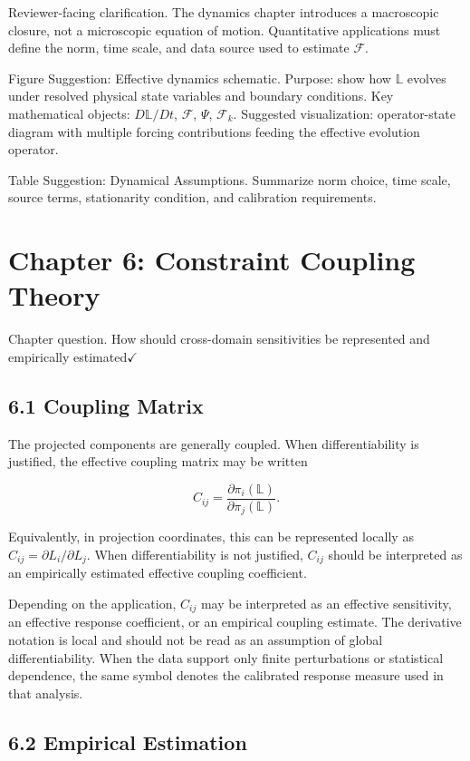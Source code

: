 \documentclass[aps,pre,reprint,superscriptaddress,nofootinbib]{revtex4-2}
\begin{document}
Reviewer-facing clarification. The dynamics chapter introduces a macroscopic closure, not a microscopic equation of motion. Quantitative applications must define the norm, time scale, and data source used to estimate \(\mathcal{F}\).

Figure Suggestion: Effective dynamics schematic. Purpose: show how \(\mathbb{L}\) evolves under resolved physical state variables and boundary conditions. Key mathematical objects: \(D\mathbb{L}/Dt\), \(\mathcal{F}\), \(\Psi\), \(\mathcal{F}_k\). Suggested visualization: operator-state diagram with multiple forcing contributions feeding the effective evolution operator.

Table Suggestion: Dynamical Assumptions. Summarize norm choice, time scale, source terms, stationarity condition, and calibration requirements.

\section{Chapter 6: Constraint Coupling Theory}

Chapter question. How should cross-domain sensitivities be represented and empirically estimated$\checkmark$

\subsection{6.1 Coupling Matrix}

The projected components are generally coupled. When differentiability is justified, the effective coupling matrix may be written

\[ C_{ij}=\frac{\partial \pi_i(\mathbb{L})}{\partial \pi_j(\mathbb{L})}. \]

Equivalently, in projection coordinates, this can be represented locally as \(C_{ij}=\partial L_i/\partial L_j\). When differentiability is not justified, \(C_{ij}\) should be interpreted as an empirically estimated effective coupling coefficient.

Depending on the application, \(C_{ij}\) may be interpreted as an effective sensitivity, an effective response coefficient, or an empirical coupling estimate. The derivative notation is local and should not be read as an assumption of global differentiability. When the data support only finite perturbations or statistical dependence, the same symbol denotes the calibrated response measure used in that analysis.

\subsection{6.2 Empirical Estimation}
\end{document}
